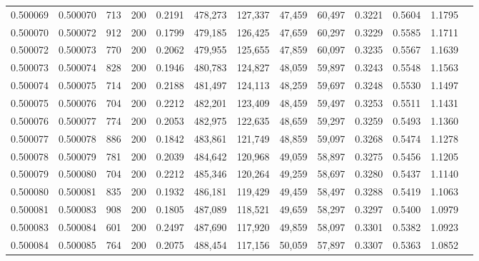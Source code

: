 \begin{tabular}{rrrrrrrrrrrrr}
0.500069 & 0.500070 &    713 & 200 &                                     0.2191 & 478,273 & 127,337 &  47,459 &  60,497 & 0.3221 & 0.5604 & 1.1795 \\
0.500070 & 0.500072 &    912 & 200 &                                     0.1799 & 479,185 & 126,425 &  47,659 &  60,297 & 0.3229 & 0.5585 & 1.1711 \\
0.500072 & 0.500073 &    770 & 200 &                                     0.2062 & 479,955 & 125,655 &  47,859 &  60,097 & 0.3235 & 0.5567 & 1.1639 \\
0.500073 & 0.500074 &    828 & 200 &                                     0.1946 & 480,783 & 124,827 &  48,059 &  59,897 & 0.3243 & 0.5548 & 1.1563 \\
0.500074 & 0.500075 &    714 & 200 &                                     0.2188 & 481,497 & 124,113 &  48,259 &  59,697 & 0.3248 & 0.5530 & 1.1497 \\
0.500075 & 0.500076 &    704 & 200 &                                     0.2212 & 482,201 & 123,409 &  48,459 &  59,497 & 0.3253 & 0.5511 & 1.1431 \\
0.500076 & 0.500077 &    774 & 200 &                                     0.2053 & 482,975 & 122,635 &  48,659 &  59,297 & 0.3259 & 0.5493 & 1.1360 \\
0.500077 & 0.500078 &    886 & 200 &                                     0.1842 & 483,861 & 121,749 &  48,859 &  59,097 & 0.3268 & 0.5474 & 1.1278 \\
0.500078 & 0.500079 &    781 & 200 &                                     0.2039 & 484,642 & 120,968 &  49,059 &  58,897 & 0.3275 & 0.5456 & 1.1205 \\
0.500079 & 0.500080 &    704 & 200 &                                     0.2212 & 485,346 & 120,264 &  49,259 &  58,697 & 0.3280 & 0.5437 & 1.1140 \\
0.500080 & 0.500081 &    835 & 200 &                                     0.1932 & 486,181 & 119,429 &  49,459 &  58,497 & 0.3288 & 0.5419 & 1.1063 \\
0.500081 & 0.500083 &    908 & 200 &                                     0.1805 & 487,089 & 118,521 &  49,659 &  58,297 & 0.3297 & 0.5400 & 1.0979 \\
0.500083 & 0.500084 &    601 & 200 &                                     0.2497 & 487,690 & 117,920 &  49,859 &  58,097 & 0.3301 & 0.5382 & 1.0923 \\
0.500084 & 0.500085 &    764 & 200 &                                     0.2075 & 488,454 & 117,156 &  50,059 &  57,897 & 0.3307 & 0.5363 & 1.0852 \\

\end{tabular}
